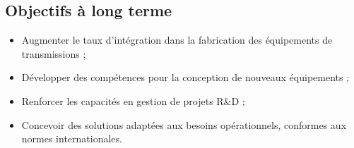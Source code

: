 \subsection{Objectifs à long terme}
\label{subsec:objectifs_labo}

\begin{itemize}
    \item Augmenter le taux d’intégration dans la fabrication des équipements de transmissions ;
    \item Développer des compétences pour la conception de nouveaux équipements ;
    \item Renforcer les capacités en gestion de projets R\&D ;
    \item Concevoir des solutions adaptées aux besoins opérationnels, conformes aux normes internationales.
\end{itemize}


